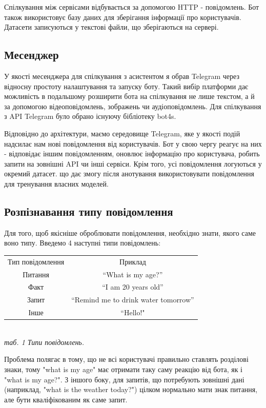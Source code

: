 Спілкування між сервісами відбувається за допомогою HTTP - повідомлень. Бот також використовує базу даних для зберігання інформації про користувачів. Датасети записуються у текстові файли, що зберігаються на сервері.
\subsection{Месенджер}
У якості месенджера для спілкування з асистентом я обрав Telegram через відносну простоту налаштування та запуску боту. Такий вибір платформи дає можливість в подальшому розширити бота на спілкування не лише текстом, а й за допомогою відеоповідомлень, зображень чи аудіоповідомлень. Для спілкування з API Telegram було обрано існуючу бібліотеку bot4s. 

Відповідно до архітектури, маємо середовище Telegram, яке у якості подій надсилає нам нові повідомлення від користувачів. Бот у свою чергу реагує на них - відповідає іншим повідомленням, оновлює інформацію про користувача, робить запити на зовнішні API чи інші сервіси. Крім того, усі повідомлення логуються у окремий датасет. що дає змогу після анотування використовувати повідомлення для тренування власних моделей.
\subsection{Розпізнавання типу повідомлення}
Для того, щоб якісніше оброблювати повідомлення, необхідно знати, якого саме воно типу.  Введемо 4 наступні типи повідомлень:
\begin{center}
\begin{tabular}{ |c|c| } 
 \hline
Тип повідомлення & Приклад\\
Питання & “What is my age?”\\
Факт & “I am 20 years old”\\
Запит & “Remind me to drink water tomorrow”\\
Інше & “Hello!"\\
 \hline
\end{tabular}
\end{center}\\
\textit{таб. 1 Типи повідомлень.}


Проблема полягає в тому, що не всі користувачі правильно ставлять розділові знаки, тому "what is my age"  має отримати таку саму реакцію від бота, як і "what is my age?". З іншого боку, для запитів, що потребують зовнішні дані (наприклад, "what is the weather today?") цілком нормально мати знак питання, але бути кваліфікованим як саме запит.


